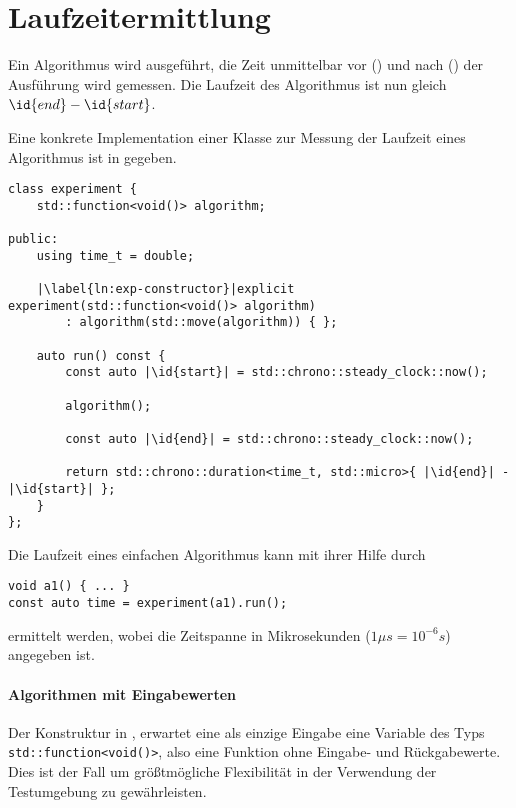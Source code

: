 \section{Laufzeitermittlung}
\label{sec:laufzeiterm}

Ein Algorithmus wird ausgeführt, die Zeit unmittelbar vor () und nach () der Ausführung wird gemessen. Die Laufzeit des Algorithmus ist nun gleich $\id{end} - \id{start}$.

Eine konkrete Implementation einer Klasse zur Messung der Laufzeit eines Algorithmus ist in  gegeben. 

\begin{lstlisting}[caption={Implementation einer Klasse zur Ermittlung der Laufzeit eines Algorithmus.}, label=lst:experiment]
class experiment {
	std::function<void()> algorithm;

public:
	using time_t = double;

	|\label{ln:exp-constructor}|explicit experiment(std::function<void()> algorithm)
		: algorithm(std::move(algorithm)) { };

	auto run() const {
		const auto |\id{start}| = std::chrono::steady_clock::now();

		algorithm();

		const auto |\id{end}| = std::chrono::steady_clock::now();

		return std::chrono::duration<time_t, std::micro>{ |\id{end}| - |\id{start}| };
	}
};
\end{lstlisting}

Die Laufzeit eines einfachen Algorithmus kann mit ihrer Hilfe durch
\begin{lstlisting}[numbers=none]
void a1() { ... }
const auto time = experiment(a1).run();
\end{lstlisting}
ermittelt werden, wobei die Zeitspanne in Mikrosekunden ($1\mu s = 10^{-6} s$) angegeben ist.

\paragraph{Algorithmen mit Eingabewerten} Der Konstruktur in ,  erwartet eine als einzige Eingabe eine Variable des Typs \lstinline{std::function<void()>}, also eine Funktion ohne Eingabe- und Rückgabewerte. Dies ist der Fall um größtmögliche Flexibilität in der Verwendung der Testumgebung zu gewährleisten.

